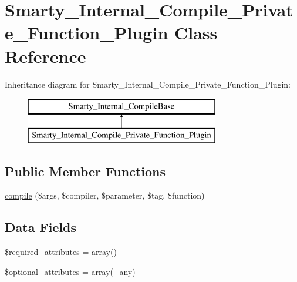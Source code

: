 \hypertarget{class_smarty___internal___compile___private___function___plugin}{}\section{Smarty\+\_\+\+Internal\+\_\+\+Compile\+\_\+\+Private\+\_\+\+Function\+\_\+\+Plugin Class Reference}
\label{class_smarty___internal___compile___private___function___plugin}
Inheritance diagram for Smarty\+\_\+\+Internal\+\_\+\+Compile\+\_\+\+Private\+\_\+\+Function\+\_\+\+Plugin\+:\begin{figure}[H]
\begin{center}
\leavevmode
\includegraphics[height=2.000000cm]{class_smarty___internal___compile___private___function___plugin}
\end{center}
\end{figure}
\subsection*{Public Member Functions}
\begin{DoxyCompactItemize}
\item 
\hyperlink{class_smarty___internal___compile___private___function___plugin_a738746fa10dc02e92fbfbc899ac2a01f}{compile} (\$args, \$compiler, \$parameter, \$tag, \$function)
\end{DoxyCompactItemize}
\subsection*{Data Fields}
\begin{DoxyCompactItemize}
\item 
\hyperlink{class_smarty___internal___compile___private___function___plugin_ae799507d5461de485f3a618abeecea95}{\$required\+\_\+attributes} = array()
\item 
\hyperlink{class_smarty___internal___compile___private___function___plugin_a899d1eb4a6fecbd6ce696adb171c80a4}{\$optional\+\_\+attributes} = array(\textquotesingle{}\+\_\+any\textquotesingle{})
\end{DoxyCompactItemize}


